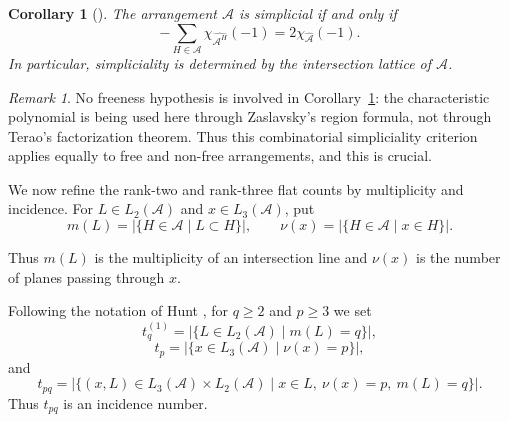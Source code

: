 \documentclass[11pt]{article}
\newtheorem{corollary}[theorem]{Corollary}
\theoremstyle{definition}
\theoremstyle{remark}
\newtheorem{remark}[theorem]{Remark}
\newcommand{\cA}{\mathcal A}
\begin{document}
\begin{corollary}[{\cite[Corollary 2.4]{CuntzGeis}}]
\label{cor:characteristic-polynomial-criterion}
The arrangement $\cA$ is simplicial if and only if
\[
-\sum_{H\in\cA}
\chi_{\widehat{\cA^H}}(-1)
=
2\chi_{\widehat{\cA}}(-1).
\]
In particular, simpliciality is determined by the intersection lattice
of $\cA$.
\end{corollary}

\begin{remark}
No freeness hypothesis is involved in Corollary~\ref{cor:characteristic-polynomial-criterion}:
the characteristic polynomial is being used here through Zaslavsky's region
formula, not through Terao's factorization theorem.  Thus this combinatorial
simpliciality criterion applies equally to free and non-free arrangements, and this is crucial.
\end{remark}

We now refine the rank-two and rank-three flat counts by multiplicity and incidence. For
$L\in L_2(\cA)$ and $x\in L_3(\cA)$, put
\[
m(L)=\bigl|\{H\in\cA\mid L\subset H\}\bigr|,
\qquad
\nu(x)=\bigl|\{H\in\cA\mid x\in H\}\bigr|.
\]

Thus $m(L)$ is the multiplicity of an intersection line and $\nu(x)$ is the
number of planes passing through $x$.

Following the notation of Hunt \cite[Section 2.1]{Hunt}, for $q\geq 2$ and
$p\geq 3$ we set
\[
t_q^{(1)}
=
\bigl|\{L\in L_2(\cA)\mid m(L)=q\}\bigr|,
\]
\[
t_p
=
\bigl|\{x\in L_3(\cA)\mid \nu(x)=p\}\bigr|,
\]
and
\[
t_{pq}
=
\bigl|\{(x,L)\in L_3(\cA)\times L_2(\cA)
\mid x\in L,\ \nu(x)=p,\ m(L)=q\}\bigr|.
\]
Thus $t_{pq}$ is an incidence number.%
\end{document}
